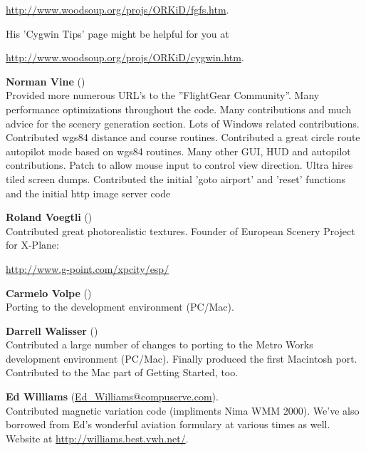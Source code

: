  \href{http://www.woodsoup.org/projs/ORKiD/fgfs.htm}{http://www.woodsoup.org/projs/ORKiD/fgfs.htm}.
 \medskip

\noindent
  His 'Cygwin Tips' page might be helpful for you at
  \medskip
  
  
  
   \href{http://www.woodsoup.org/projs/ORKiD/cygwin.htm}{http://www.woodsoup.org/projs/ORKiD/cygwin.htm}.
  \medskip

\noindent \textbf{Norman Vine} ()\\
  Provided more numerous URL's to the ''FlightGear Community''.
  Many performance optimizations throughout the code.  Many contributions
  and much advice for the scenery generation section.  Lots of Windows
  related contributions. Contributed wgs84 distance and course routines.
  Contributed a great circle route autopilot mode based on wgs84 routines.
  Many other GUI, HUD and autopilot contributions.  Patch to allow mouse input to control view direction. Ultra hires tiled screen dumps. Contributed the initial 'goto airport' and 'reset' functions and the initial http image server code
\medskip

\noindent \textbf{Roland Voegtli}
()\\
 Contributed great photorealistic textures.   Founder of European Scenery Project for
 X-Plane:
 \medskip

  \href{http://www.g-point.com/xpcity/esp/}{http://www.g-point.com/xpcity/esp/}
\medskip


\noindent \textbf{Carmelo Volpe}
()\\
  Porting \FlightGear{} to the  development environment
  (PC/Mac).
 \medskip

\noindent \textbf{Darrell Walisser}
()\\
 Contributed a large number of changes to porting \FlightGear{} to the Metro Works development environment (PC/Mac). Finally produced the first Macintosh port. Contributed to the Mac part of Getting Started, too.
\medskip

\noindent \textbf{Ed Williams}
(\href{Ed_Williams@compuserve.com}{Ed\_Williams@compuserve.com}).\\
  Contributed magnetic variation code (impliments Nima WMM 2000).
  We've also borrowed from Ed's wonderful aviation formulary at various
  times as well. Website at
  \medskip
  \href{http://williams.best.vwh.net/}{http://williams.best.vwh.net/}.
 \medskip


